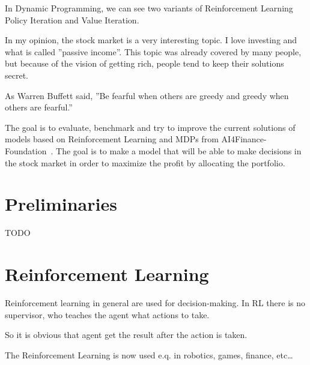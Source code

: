 In Dynamic Programming, we can see two variants of Reinforcement Learning
Policy Iteration and Value Iteration.

In my opinion, the stock market is a very interesting topic.
I love investing and what is called ''passive income''.
This topic was already covered by many people, but because of the
vision of getting rich, people tend to keep their solutions secret.

As Warren Buffett said, ''Be fearful when others are greedy and greedy when others are fearful.''

The goal is to evaluate, benchmark and try to improve the current solutions of models
based on Reinforcement Learning and MDPs from AI4Finance-Foundation~\cite{https://doi.org/10.48550/arxiv.2111.03995}.
The goal is to make a model that will be able to make decisions in the stock market
in order to maximize the profit by allocating the portfolio.





\chapter{Preliminaries}\label{ch:preliminaries}
TODO




\chapter{Reinforcement Learning}\label{ch:reinforcement-learning}
Reinforcement learning in general are used for decision-making.
In RL there is no supervisor, who teaches the agent what actions to take.

So it is obvious that agent get the result after the action is taken.

The Reinforcement Learning is now used e.q. in robotics, games, finance, etc\ldots


